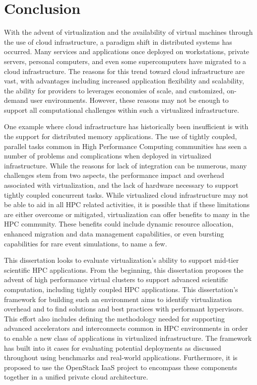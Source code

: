 
\chapter{Conclusion}
\label{chap:conc}

With the advent of virtualization and the availability of virtual machines through the use of cloud infrastructure, a paradigm shift in distributed systems has occurred. Many services and applications once deployed on workstations, private servers, personal computers, and even some supercomputers have migrated to a cloud infrastructure. The reasons for this  trend toward cloud infrastructure are vast, with advantages including increased application flexibility and scalability, the ability for providers to leverages economies of scale, and customized, on-demand user environments.  However, these reasons may not be enough to support all computational challenges within such a virtualized infrastructure.

One example where cloud infrastructure has historically been insufficient is with the support for distributed memory applications. The use of tightly coupled, parallel tasks common in High Performance Computing communities has seen a number of problems and complications when deployed in virtualized infrastructure.  While the reasons for lack of integration can be numerous, many challenges stem from two aspects, the performance impact and overhead associated with virtualization, and the lack of hardware necessary to support tightly coupled concurrent tasks.  While virtualized cloud infrastructure may not be able to aid in all HPC related activities, it is possible that if these limitations are either overcome or mitigated, virtualization can offer benefits to many in the HPC community. These benefits could include dynamic resource allocation, enhanced migration and data management capabilities, or even bursting capabilities for rare event simulations, to name a few.  

This dissertation looks to evaluate virtualization's ability to support mid-tier scientific HPC applications. From the beginning, this dissertation proposes the advent of high performance virtual clusters to support advanced scientific computation, including tightly coupled HPC applications.  This dissertation's framework for building such an environment aims to identify virtualization overhead and to find solutions and best practices with performant hypervisors. This effort also includes defining the methodology needed for supporting advanced accelerators and interconnects common in HPC environments in order to enable a new class of applications in virtualized infrastructure. The framework has built into it cases for evaluating potential deployments as discussed throughout using benchmarks and real-world applications.  Furthermore, it is proposed to use the OpenStack IaaS project to encompass these components together in a unified private cloud architecture.  

